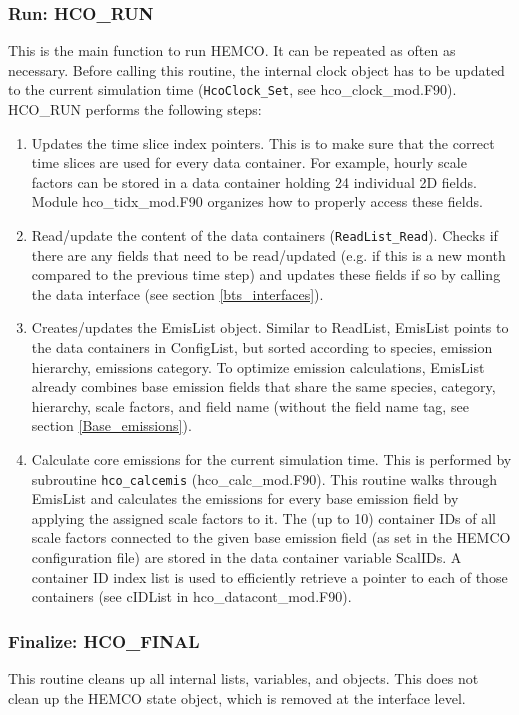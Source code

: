 \documentclass[12pt,a4paper]{article} %
\begin{document}
\subsubsection{Run: HCO\_RUN}
This is the main function to run HEMCO. It can be repeated as often as necessary. Before calling this routine, the internal clock object has to be updated to the current simulation time (\texttt{HcoClock\_Set}, see hco\_clock\_mod.F90). HCO\_RUN performs the following steps:
\begin{enumerate}
\item Updates the time slice index pointers. This is to make sure that the correct time slices are used for every data container. For example, hourly scale factors can be stored in a data container holding 24 individual 2D fields. Module hco\_tidx\_mod.F90 organizes how to properly access these fields.
\item Read/update the content of the data containers (\texttt{ReadList\_Read}). Checks if there are any fields that need to be read/updated (e.g. if this is a new month compared to the previous time step) and updates these fields if so by calling the data interface (see section \ref{bts_interfaces}).
\item Creates/updates the EmisList object. Similar to ReadList, EmisList points to the data containers in ConfigList, but sorted according to species, emission hierarchy, emissions category. To optimize emission calculations, EmisList already combines base emission fields that share the same species, category, hierarchy, scale factors, and field name (without the field name tag, see section \ref{Base_emissions}).
\item Calculate core emissions for the current simulation time. This is performed by subroutine \texttt{hco\_calcemis} (hco\_calc\_mod.F90). This routine walks through EmisList and calculates the emissions for every base emission field by applying the assigned scale factors to it. The (up to 10) container IDs of all scale factors connected to the given base emission field (as set in the HEMCO configuration file) are stored in the data container variable ScalIDs. A container ID index list is used to efficiently retrieve a pointer to each of those containers (see cIDList in hco\_datacont\_mod.F90).
\end{enumerate}

\subsubsection{Finalize: HCO\_FINAL}
This routine cleans up all internal lists, variables, and objects. This does not clean up the HEMCO state object, which is removed at the interface level.
\end{document}
